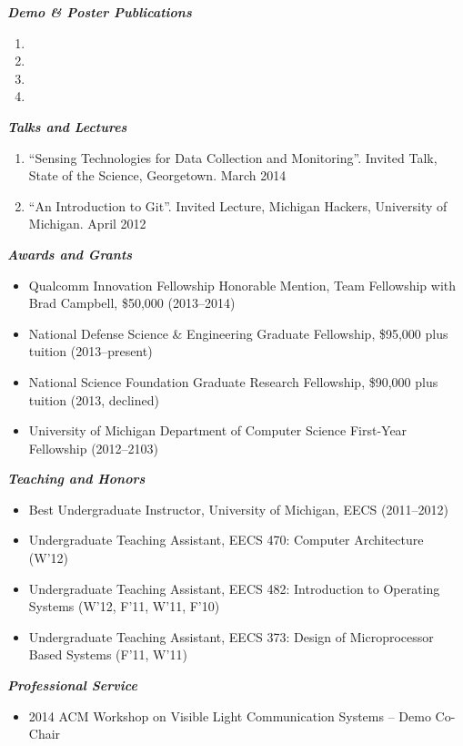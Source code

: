 \documentclass{article}
\begin{document}
{\bf {\em Demo \& Poster Publications}}
\begin{enumerate}

  \item {}
  \item {}
  \item {}
  \item {}

\end{enumerate}

{\bf {\em Talks and Lectures}}

\begin{enumerate}

\item ``Sensing Technologies for Data Collection and Monitoring''. Invited
  Talk, State of the Science, Georgetown. March 2014
\item ``An Introduction to Git''. Invited Lecture, Michigan Hackers,
University of Michigan. April 2012

\end{enumerate}

{\bf {\em Awards and Grants}}

\begin{itemize}

  \item Qualcomm Innovation Fellowship Honorable Mention, Team Fellowship with Brad Campbell, \$50,000 (2013--2014)
  \item National Defense Science \& Engineering Graduate Fellowship, \$95,000 plus tuition (2013--present)
  \item National Science Foundation Graduate Research Fellowship, \$90,000 plus tuition (2013, declined)
  \item University of Michigan Department of Computer Science First-Year Fellowship (2012--2103)

\end{itemize}

{\bf {\em Teaching and Honors}}

\begin{itemize}

  \item Best Undergraduate Instructor, University of Michigan, EECS (2011--2012)
  \item Undergraduate Teaching Assistant, EECS 470: Computer Architecture (W'12)
  \item Undergraduate Teaching Assistant, EECS 482: Introduction to Operating Systems (W'12, F'11, W'11, F'10)
  \item Undergraduate Teaching Assistant, EECS 373: Design of Microprocessor Based Systems (F'11, W'11)

\end{itemize}

{\bf {\em Professional Service}}

\begin{itemize}

  \item 2014 ACM Workshop on Visible Light Communication Systems -- Demo Co-Chair

\end{itemize}
\end{document}
